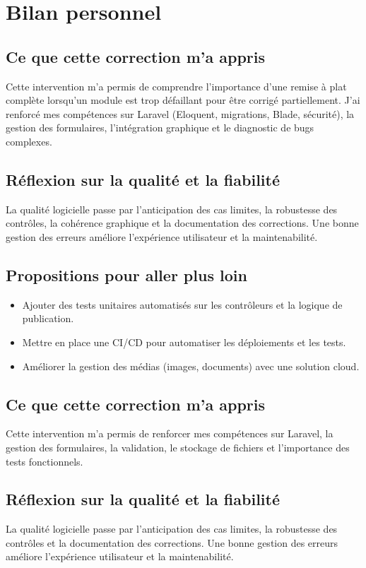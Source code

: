 \documentclass[a4paper,12pt]{report}
\begin{document}
\section{Bilan personnel}
\subsection{Ce que cette correction m’a appris}
Cette intervention m’a permis de comprendre l’importance d’une remise à plat complète lorsqu’un module est trop défaillant pour être corrigé partiellement. J’ai renforcé mes compétences sur Laravel (Eloquent, migrations, Blade, sécurité), la gestion des formulaires, l’intégration graphique et le diagnostic de bugs complexes.

\subsection{Réflexion sur la qualité et la fiabilité}
La qualité logicielle passe par l’anticipation des cas limites, la robustesse des contrôles, la cohérence graphique et la documentation des corrections. Une bonne gestion des erreurs améliore l’expérience utilisateur et la maintenabilité.

\subsection{Propositions pour aller plus loin}
\begin{itemize}
    \item Ajouter des tests unitaires automatisés sur les contrôleurs et la logique de publication.
    \item Mettre en place une CI/CD pour automatiser les déploiements et les tests.
    \item Améliorer la gestion des médias (images, documents) avec une solution cloud.
\end{itemize}

\subsection{Ce que cette correction m’a appris}
Cette intervention m’a permis de renforcer mes compétences sur Laravel, la gestion des formulaires, la validation, le stockage de fichiers et l’importance des tests fonctionnels.

\subsection{Réflexion sur la qualité et la fiabilité}
La qualité logicielle passe par l’anticipation des cas limites, la robustesse des contrôles et la documentation des corrections. Une bonne gestion des erreurs améliore l’expérience utilisateur et la maintenabilité.
\end{document}
